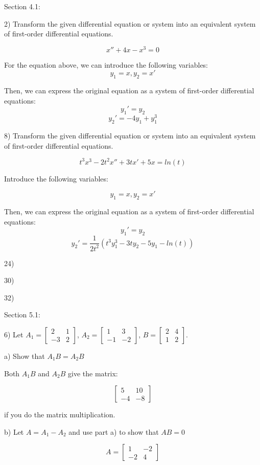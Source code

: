 \documentclass{article}
\begin{document}
Section 4.1:

2) Transform the given differential equation or system into an equivalent system of first-order differential equations.

\[x'' + 4x - x^3 = 0\]

For the equation above, we can introduce the following variables:
\[y_1 = x, y_2 = x'\]

Then, we can express the original equation as a system
of first-order differential equations:
\[y_1' = y_2\]
\[y_2' = -4y_1 + y_1^3\]


8) Transform the given differential equation or system into an equivalent system of first-order differential equations.

\[t^3 x^3 - 2 t^2 x'' + 3 t x' + 5 x = ln(t)\]

Introduce the following variables:

\[y_1 = x, y_2 = x'\]

Then, we can express the original equation as a system
of first-order differential equations:
\[y_1' = y_2\]
\[y_2' = \frac{1}{2t^2} (t^3 y_1^3 - 3 t y_2 - 5 y_1 - ln(t))\]


24)

30) 

32)


Section 5.1:

6) Let $A_1 = \begin{bmatrix}
    2 & 1 \\
    -3 & 2
\end{bmatrix}$, $A_2 = \begin{bmatrix}
    1 & 3 \\
    -1 & -2
\end{bmatrix}$, $B = \begin{bmatrix}
    2 & 4 \\
    1 & 2
\end{bmatrix}$.

a) Show that $A_1 B = A_2 B$

Both $A_1 B$ and $A_2 B$ give the matrix:

\[\begin{bmatrix}
    5 & 10 \\
    -4 & -8
\end{bmatrix}\]

if you do the matrix multiplication.

b) Let $A = A_1 - A_2$ and use part a) to show that $AB = 0$

\[A = \begin{bmatrix}
    1 & -2 \\
    -2 & 4
\end{bmatrix}\]
\end{document}

